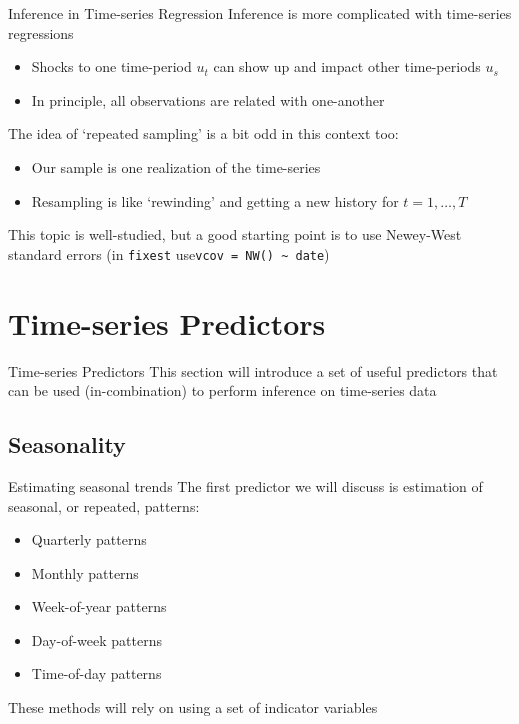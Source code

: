 \documentclass[aspectratio=169,t,11pt,table]{beamer}
\begin{document}
\begin{frame}{Inference in Time-series Regression}
  Inference is more complicated with time-series regressions
  
  \begin{itemize}
    \item Shocks to one time-period $u_t$ can show up and impact other time-periods $u_s$
    \item In principle, all observations are related with one-another
  \end{itemize}

  \pause
  \bigskip\medskip
  The idea of `repeated sampling' is a bit odd in this context too:
  \begin{itemize}
    \item Our sample is one realization of the time-series
    
    \item Resampling is like `rewinding' and getting a new history for $t = 1, \dots, T$
  \end{itemize}

  \pause
  \bigskip
  This topic is well-studied, but a good starting point is to use Newey-West standard errors (in \texttt{fixest} use\texttt{vcov = NW() \textasciitilde{} date})
\end{frame}

\section{Time-series Predictors}

\begin{frame}{Time-series Predictors}
  This section will introduce a set of useful predictors that can be used (in-combination) to perform inference on time-series data
\end{frame}

\subsection{Seasonality}

\begin{frame}{Estimating seasonal trends}
  The first predictor we will discuss is estimation of seasonal, or repeated, patterns:
  \begin{itemize}
    \item Quarterly patterns
    \item Monthly patterns
    \item Week-of-year patterns
    \item Day-of-week patterns
    \item Time-of-day patterns
  \end{itemize}

  \bigskip
  These methods will rely on using a set of indicator variables
\end{frame}
\end{document}
